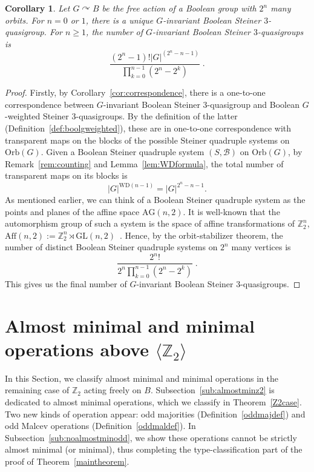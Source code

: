 \documentclass{article}
\newtheorem{corollary}[theorem]{Corollary}
\theoremstyle{remark}
\theoremstyle{definition}
\def\acts{\curvearrowright}
\begin{document}
\begin{corollary}\label{cor:counting} Let $G\acts B$ be the free action of a Boolean group with $2^n$ many orbits. For $n=0$ or $1$, there is a unique $G$-invariant Boolean Steiner $3$-quasigroup. For $n\geq 1$, the number of $G$-invariant Boolean Steiner $3$-quasigroups is
\[\frac{(2^{n}-1)!|G|^{(2^{n}-n-1)}}{\prod_{k=0}^{n-1}(2^n-2^k)} \;.\] 
\end{corollary}
\begin{proof} Firstly, by Corollary~\ref{cor:correspondence}, there is a one-to-one correspondence between $G$-invariant Boolean Steiner $3$-quasigroup and Boolean $G$-weighted Steiner $3$-quasigroups. By the definition of the latter (Definition~\ref{def:boolgweighted}), these are in one-to-one correspondence with transparent maps on the blocks of the possible Steiner quadruple systems on $\mathrm{Orb}(G)$. Given a Boolean Steiner quadruple system $(S, \mathcal{B})$ on $\mathrm{Orb}(G)$, by Remark~\ref{rem:counting} and Lemma~\ref{lem:WDformula}, the total number of transparent maps on its blocks is 
\[|G|^{\mathrm{WD}(n-1)}=|G|^{2^n -n-1}.\]
As mentioned earlier, we can think of a Boolean Steiner quadruple system as the points and planes of the affine space $\mathrm{AG}(n, 2)$. It is well-known that the automorphism group of such a system is the space of affine transformations of $\mathbb{Z}_2^n$, $\mathrm{Aff}(n,2):=\mathbb{Z}_2^n\rtimes\mathrm{GL}(n, 2)$~\cite[Example 6.2.3]{dixon1996permutation}. Hence, by the orbit-stabilizer theorem, the number of distinct Boolean Steiner quadruple systems on $2^n$ many vertices is
\[\frac{2^n!}{2^n\prod_{k=0}^{n-1}(2^n-2^k)}\;.\]
This gives us the final number of $G$-invariant Boolean Steiner $3$-quasigroups.
\end{proof}

\section{Almost minimal and minimal operations above \texorpdfstring{${\langle\mathbb{Z}_2\rangle}$}{Z2}}\label{sec:z2}

In this Section, we classify almost minimal and minimal operations in the remaining case of $\mathbb{Z}_2$ acting freely on $B$. Subsection~\ref{sub:almostminz2} is dedicated to almost minimal operations, which we classify in Theorem~\ref{Z2case}. Two new kinds of operation appear: odd majorities (Definition~\ref{oddmajdef}) and odd Malcev operations (Definition~\ref{oddmaldef}). In Subsection~\ref{sub:noalmostminodd}, we show these operations cannot be strictly almost minimal (or minimal), thus completing the type-classification part of the proof of Theorem~\ref{maintheorem}.
\end{document}
